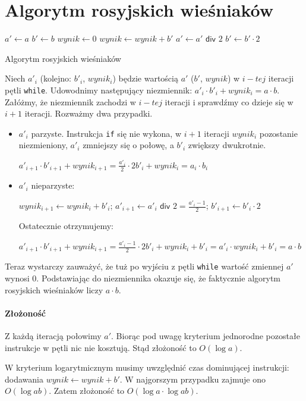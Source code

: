 \section{Algorytm rosyjskich wieśniaków}

\begin{algorithm}[h]
  \DontPrintSemicolon
  
  
  
  $a' \leftarrow a$\;
  $b' \leftarrow b$\;
  $wynik \leftarrow 0$\;
  {
    {
      $wynik \leftarrow wynik + b'$\;
    }
    $a' \leftarrow a' \textsf{ div } 2$\;
    $b' \leftarrow b' \cdot 2$\;
  }
  
  \caption{Algorytm rosyjskich wieśniaków}
  \label{alg-wiesniakow}
\end{algorithm}

Niech $a'_i$ (kolejno: $b'_i$, $wynik_i$) będzie wartością $a'$ ($b'$, $wynik$) w $i-tej$ iteracji pętli \texttt{while}. Udowodnimy następujący niezmiennik: $a'_i \cdot b'_i + wynik_i = a \cdot b$. Załóżmy, że niezmiennik zachodzi w $i-tej$ iteracji i sprawdźmy co dzieje się w $i+1$ iteracji. Rozważmy dwa przypadki.


\begin{itemize}
    \item $a'_i$ parzyste. Instrukcja \texttt{if} się nie wykona, w $i+1$ iteracji $wynik_i$ pozostanie niezmieniony, $a'_i$ zmniejszy się o połowę, a $b'_i$ zwiększy dwukrotnie. 

$a'_{i+1} \cdot b'_{i+1} + wynik_{i+1} = \frac{a'_i}{2} \cdot 2 b'_i + wynik_i = a_i \cdot b_i$


\item $a'_i$ nieparzyste:

$wynik_{i+1} \leftarrow wynik_i + b'_i$;  
$a'_{i+1} \leftarrow a'_i \textsf{ div } 2 = \frac{a'_i-1}{2}$;  
$b'_{i+1} \leftarrow b'_i \cdot 2$

Ostatecznie otrzymujemy:

$a'_{i+1} \cdot b'_{i+1} + wynik_{i+1} = \frac{a'_i-1}{2} \cdot 2 b'_i + wynik_i +b'_i = a'_i \cdot wynik_i + b'_i= a \cdot b$

\end{itemize}

Teraz wystarczy zauważyć, że tuż po wyjściu z pętli \texttt{while} wartość zmiennej $a'$ wynosi $0$. Podstawiając do niezmiennika okazuje się, że faktycznie algorytm rosyjskich wieśniaków liczy $a \cdot b$.

\paragraph{Złożoność}

Z każdą iteracją połowimy $a'$. Biorąc pod uwagę kryterium jednorodne pozostałe instrukcje w pętli nic nie kosztują. Stąd złożoność to $O(\log a)$.

W kryterium logarytmicznym musimy uwzględnić czas dominującej instrukcji: dodawania  $wynik \leftarrow wynik + b'$. W najgorszym przypadku zajmuje ono $O(\log ab)$. Zatem złożoność to $O(\log a \cdot \log ab)$.
